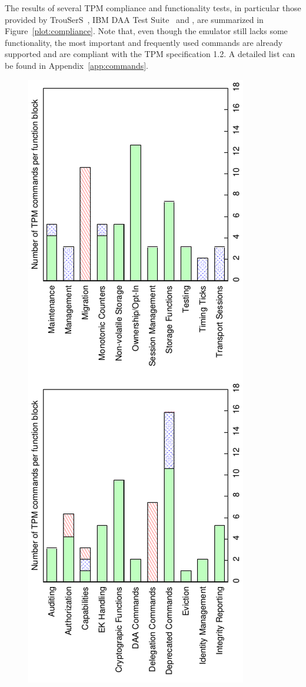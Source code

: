 \documentclass[runningheads]{llncs}
\begin{document}
The results of several TPM compliance and functionality tests, in particular
those provided by TrouSerS~\cite{trousers}, IBM DAA Test Suite~\cite{ibmdaatest}
and \cite{Sadeghi}, are summarized in Figure~\ref{plot:compliance}.
Note that, even though the emulator still lacks some functionality,
the most important and frequently used commands are already supported and
are compliant with the TPM specification 1.2.
A detailed list can be found in Appendix~\ref{app:commands}.

\begin{figure}
	\begin{center}
		\includegraphics[angle=-90,scale=0.6]{plots/compliance}

\end{center}
\end{figure}
\end{document}
